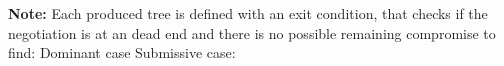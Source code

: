 \documentclass{llncs}
\begin{document}
\textbf{Note:} Each produced tree is defined with an exit condition, that checks if the negotiation is at an dead end and there is no possible remaining compromise to find:
	Dominant case
	Submissive case:
%
%
%
%
%
\end{document}

